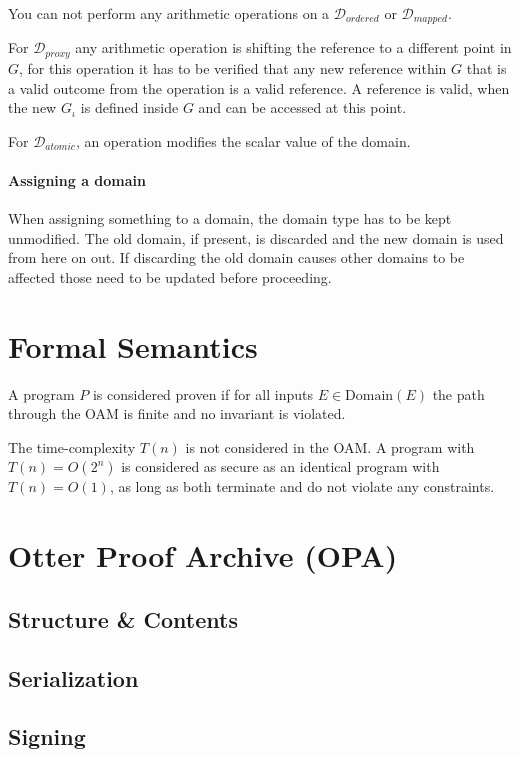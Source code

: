 \documentclass{article}
\begin{document}
    You can not perform any arithmetic operations on a $\mathcal{D}_{ordered}$ or $\mathcal{D}_{mapped}$.

    For $\mathcal{D}_{proxy}$ any arithmetic operation is shifting the reference to a different point in $G$, for this operation it has to be verified that any new reference within $G$ that is a valid outcome from the operation is a valid reference. A reference is valid, when the new $G_\iota$ is defined inside $G$ and can be accessed at this point.

    For $\mathcal{D}_{atomic}$, an operation modifies the scalar value of the domain.

    \paragraph{Assigning a domain}

    When assigning something to a domain, the domain type has to be kept unmodified. The old domain, if present, is discarded and the new domain is used from here on out. If discarding the old domain causes other domains to be affected those need to be updated before proceeding.

    \section{Formal Semantics}

    A program $P$ is considered proven if for all inputs $E\in\text{Domain}(E)$ the path through the OAM is finite and no invariant is violated.

    The time-complexity $T(n)$ is not considered in the OAM. A program with $T(n)=O(2^n)$ is considered as secure as an identical program with $T(n)=O(1)$, as long as both terminate and do not violate any constraints.

    \section{Otter Proof Archive (OPA)}

    \subsection{Structure \& Contents}

    \subsection{Serialization}

    \subsection{Signing}
\end{document}
